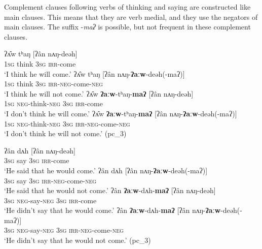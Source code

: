 \documentclass[output=paper,colorlinks,citecolor=brown]{langscibook}
\begin{document}

Complement clauses following verbs of thinking  and saying  are constructed like main clauses. This means that they are verb medial, and they use the negators of main clauses. The suffix {}-\textit{maʔ} is possible, but not frequent in these complement clauses.

\ea\label{ex:rum:51}
    \ea\label{ex:rum:51a}
        \gll ʔʌ̂w	tʰaŋ	[ʔân	nʌŋ-deəh] \\ 
             1\textsc{sg} think {\db}3\textsc{sg} \textsc{irr}{}-come \\
        \glt ‘I think he will come.’
    \ex\label{ex:rum:51b}
        \gll ʔʌ̂w	tʰaŋ	[ʔân	nʌŋ-\textbf{ʔaːw}-deəh(-maʔ)] \\
             1\textsc{sg} think {\db}3\textsc{sg} \textsc{irr}{}-\textsc{neg}{}-come-\textsc{neg} \\
        \glt ‘I think he will not come.’
    \ex\label{ex:rum:51c}
        \gll ʔʌ̂w	\textbf{ʔaːw}-tʰaŋ-\textbf{maʔ}	[ʔân	nʌŋ-deəh] \\
             1\textsc{sg} \textsc{neg}{}-think-\textsc{neg} {\db}3\textsc{sg} \textsc{irr}{}-come \\
        \glt ‘I don’t think he will come.’
    \ex\label{ex:rum:51d}
        \gll ʔʌ̂w	\textbf{ʔaːw}-tʰaŋ-\textbf{maʔ}	[ʔân	nʌŋ-\textbf{ʔaːw}-deəh(-maʔ)] \\
             1\textsc{sg} \textsc{neg}{}-think-\textsc{neg} {\db}3\textsc{sg} \textsc{irr}{}-\textsc{neg}{}-come-\textsc{neg} \\
        \glt ‘I don’t think he will not come.’ (pc\_3)
    \z
\z 

\ea\label{ex:rum:52}
    \ea\label{ex:rum:52a}
        \gll ʔân	dʌh	[ʔân	nʌŋ-deəh] \\ 
             \textsc{3sg} say {\db}3\textsc{sg} \textsc{irr}{}-come \\
        \glt ‘He said that he would come.’
    \ex\label{ex:rum:52b}
        \gll ʔân	dʌh	[ʔân	nʌŋ-\textbf{ʔaːw}-deəh(-maʔ)] \\
             \textsc{3sg} say {\db}\textsc{3sg} \textsc{irr}{}-\textsc{neg}{}-come-\textsc{neg} \\
        \glt ‘He said that he would not come.’
    \ex\label{ex:rum:52c}
        \gll ʔân	\textbf{ʔaːw}-dʌh-\textbf{maʔ}	[ʔân	nʌŋ-deəh] \\
             \textsc{3sg} \textsc{neg}{}-say-\textsc{neg} {\db}\textsc{3sg} \textsc{irr}{}-come \\
        \glt ‘He didn’t say that he would come.’
    \ex\label{ex:rum:52d}
        \gll ʔân	\textbf{ʔaːw}-dʌh-\textbf{maʔ}	[ʔân	nʌŋ-\textbf{ʔaːw}-deəh(-maʔ)] \\
             \textsc{3sg} \textsc{neg}{}-say-\textsc{neg} {\db}\textsc{3sg} \textsc{irr}{}-\textsc{neg}{}-come-\textsc{neg} \\
        \glt ‘He didn’t say that he would not come.’ (pc\_3)
    \z
\z 
\end{document}
